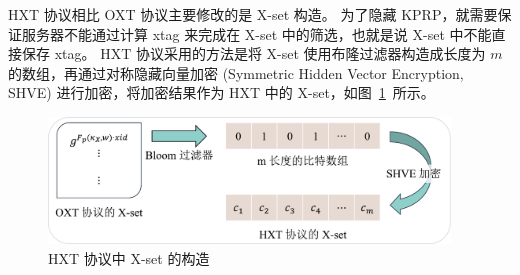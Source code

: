 HXT 协议相比 OXT 协议主要修改的是 X-set 构造。
为了隐藏 KPRP，就需要保证服务器不能通过计算 xtag 来完成在 X-set 中的筛选，也就是说 X-set 中不能直接保存 xtag。
HXT 协议采用的方法是将 X-set 使用布隆过滤器构造成长度为 $m$ 的数组，再通过对称隐藏向量加密 (Symmetric Hidden Vector Encryption, SHVE) 进行加密，将加密结果作为 HXT 中的 X-set，如图~\ref{fig:xset_example}~所示。
\begin{figure}[ht]
  \centering
  \includegraphics[width=0.95\textwidth]{figures/xset_exp.pdf}
  \caption{HXT 协议中 X-set 的构造}
  \label{fig:xset_example}
\end{figure}

